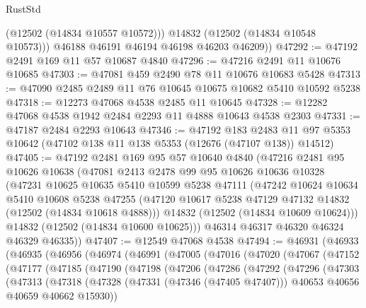 \begin{lexlean}{RustStd}
\begin{coremodule}
            (@12502 (@14834 @10557 @10572)))
          @14832
          (@12502 (@14834 @10548 @10573)))
        @46188
        @46191
        @46194
        @46198
        @46203
        @46209))
@47292 := @47192 @2491 @169 @11 @57 @10687 @4840
@47296 := @47216 @2491 @11 @10676 @10685
@47303 := @47081 @459 @2490 @78 @11 @10676 @10683 @5428
@47313 := @47090 @2485 @2489 @11 @76 @10645 @10675 @10682 @5410 @10592 @5238
@47318 := @12273 @47068 @4538 @2485 @11 @10645
@47328 := @12282 @47068 @4538 @1942 @2484 @2293 @11 @4888 @10643 @4538 @2303
@47331 := @47187 @2484 @2293 @10643
@47346 := @47192
    @183
    @2483
    @11
    @97
    @5353
    @10642
    (@47102 @138 @11 @138 @5353 (@12676 (@47107 @138)) @14512)
@47405 := @47192
    @2481
    @169
    @95
    @57
    @10640
    @4840
    (@47216
      @2481
      @95
      @10626
      @10638
      (@47081
        @2413
        @2478
        @99
        @95
        @10626
        @10636
        @10328
        (@47231
          @10625
          @10635
          @5410
          @10599
          @5238
          @47111
          (@47242
            @10624
            @10634
            @5410
            @10608
            @5238
            @47255
            (@47120 @10617 @5238 @47129 @47132 @14832 (@12502 (@14834 @10618 @4888)))
            @14832
            (@12502 (@14834 @10609 @10624)))
          @14832
          (@12502 (@14834 @10600 @10625)))
        @46314
        @46317
        @46320
        @46324
        @46329
        @46335))
@47407 := @12549 @47068 @4538
@47494 := @46931
    (@46933
      (@46935
        (@46956
          (@46974
            (@46991
              (@47005
                (@47016
                  (@47020
                    (@47067
                      (@47152
                        (@47177
                          (@47185
                            (@47190
                              (@47198
                                (@47206
                                  (@47286
                                    (@47292
                                      (@47296
                                        (@47303
                                          (@47313
                                            (@47318
                                              (@47328
                                                (@47331 (@47346 (@47405 @47407)))
                                                @40653
                                                @40656
                                                @40659
                                                @40662
                                                @15930))

\end{coremodule}
\end{lexlean}
